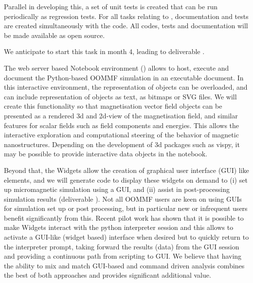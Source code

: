 \begin{workpackage}
\begin{tasklist}
\begin{task}[lead=USO,id=oommf-python-interface,title=OOMMF case study: Create Python interface to OOMMF code,PM=6]
  Parallel in developing this, a set of unit tests is created that can
  be run periodically as regression tests. For all tasks relating to
  \OOMMFNB, documentation and tests are created simultaneously with
  the code. All codes, tests and documentation will be made available as open source.

  We anticipate to start this task 
  in month 4, leading to deliverable .
\end{task}

\begin{task}[lead=USO,title=OOMMF case study: Extend \texttt{OOMMF-py} with \Jupyter
    notebook attributes and GUI templates,id=oommf-py-ipython-attributes,PM=6]

  The web server based Notebook environment (\Jupyter) allows to host,
  execute and document the Python-based OOMMF simulation in an
  executable document. In this interactive environment, the
  representation of objects can be overloaded, and can include
  representation of objects as text, as bitmaps or SVG files. We will
  create this functionality so that magnetisation vector field objects
  can be presented as a rendered 3d and 2d-view of the magnetisation
  field, and similar features for scalar fields such as field
  components and energies. This allows the interactive exploration and
  computational steering of the behavior of magnetic
  nanostructures. Depending on the development of 3d packages such as
  vispy, it may be possible to provide interactive data objects in the
  notebook.

  Beyond that, the \Jupyter Widgets allow the creation of graphical
  user interface (GUI) like elements, and we will generate code to
  display these widgets on demand to (i) set up micromagnetic
  simulation using a GUI, and (ii) assist in post-processing
  simulation results (deliverable ).
  Not all OOMMF users are keen on using GUIs for
  simulation set up or post processing, but in particular new or
  infrequent users benefit significantly from this. Recent pilot work
  has shown that it is possible to make \Jupyter Widgets interact with
  the python interpreter session and this allows to activate a
  GUI-like (widget based) interface when desired but to quickly return
  to the interpreter prompt, taking forward the results (data) from
  the GUI session \cite{IPython-widget-GUI-demo-youtube-2014} and
  providing a continuous path from scripting to GUI. We
  believe that having the ability to mix and match GUI-based and
  command driven analysis combines the best of both approaches and
  provides significant additional value.
\end{task}


\end{tasklist}
\end{workpackage}
